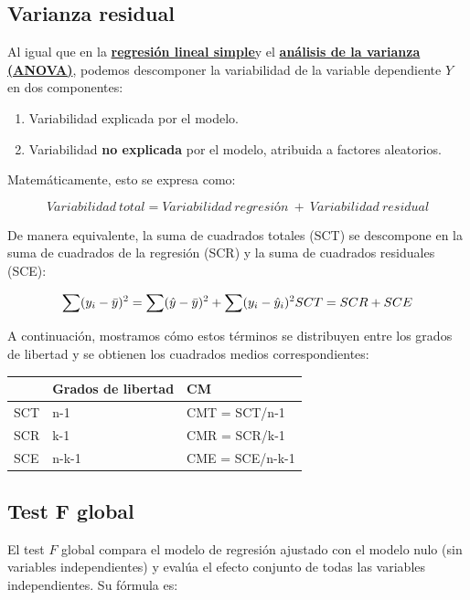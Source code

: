 \documentclass[
  spanish,
  a4paper,
]{scrbook}
\newcounter{none} %
\begin{document}
\subsection{Varianza residual}\label{varianza-residual}

Al igual que en la
\hyperref[regresiuxf3n-lineal-simple]{\textbf{regresión lineal simple}}y
el \hyperref[anuxe1lisis-de-la-varianza-anova]{\textbf{análisis de la
varianza (ANOVA)}}, podemos descomponer la variabilidad de la variable
dependiente \(Y\) en dos componentes:

\begin{enumerate}
\def\labelenumi{\arabic{enumi}.}
\item
  Variabilidad explicada por el modelo.
\item
  Variabilidad \textbf{no explicada} por el modelo, atribuida a factores
  aleatorios.
\end{enumerate}

Matemáticamente, esto se expresa como:

\[
Variabilidad \ total = Variabilidad \ regresión \ + \ Variabilidad \ residual
\]

De manera equivalente, la suma de cuadrados totales (SCT) se descompone
en la suma de cuadrados de la regresión (SCR) y la suma de cuadrados
residuales (SCE):

\[
\sum (y_i-\bar{y})^2 = \sum (\hat{y}-\bar{y})^2 + \sum (y_i -\hat{y}_i)^2
\\
SCT = SCR + SCE
\]

A continuación, mostramos cómo estos términos se distribuyen entre los
grados de libertad y se obtienen los cuadrados medios correspondientes:

{\def\LTcaptype{none} %
\begin{longtable}[]{@{}lll@{}}
\toprule\noalign{}
& Grados de libertad & CM \\
\midrule\noalign{}
\endhead
\bottomrule\noalign{}
\endlastfoot
SCT & n-1 & CMT = SCT/n-1 \\
SCR & k-1 & CMR = SCR/k-1 \\
SCE & n-k-1 & CME = SCE/n-k-1 \\
\end{longtable}
}

\subsection{Test F global}\label{test-f-global}

El test \(F\) global compara el modelo de regresión ajustado con el
modelo nulo (sin variables independientes) y evalúa el efecto conjunto
de todas las variables independientes. Su fórmula es:
\end{document}
